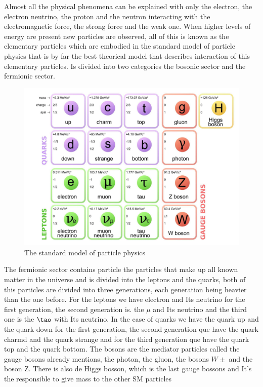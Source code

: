 Almost all the physical phenomena can be explained with only the electron, the electron neutrino, the proton and the neutron interacting with the electromagnetic force, the strong force and the weak one. When higher levels of energy are present new particles are observed, all of this is known as the elementary particles which are embodied in the standard model of particle physics that is by far the best theorical model that describes interaction of this elementary particles. Is divided into two categories the bosonic sector and the fermionic sector.  \cite{mppthomson}   


\begin{figure}[h]
    \centering
   \includegraphics[width=1\textwidth]{sm.png}
    \caption{The standard model of particle physics}
    \label{fig:four-forces}
\end{figure}


The fermionic sector contains particle the particles that make up all known matter in the universe and is divided into the leptons and the quarks, both of this particles are divided into three generations, each generation being heavier than the one before. For the leptons we have electron and Its neutrino for the first generation, the second generation is. the $\mu$ and Its neutrino and the third one is the $\tao$ with Its neutrino. In the case of quarks we have the quark up and the quark down for the first generation, the second generation que have the quark charmd and the quark strange and for the third generation que have the quark top and the quark bottom. The bosons are the mediator particles called the gauge bosons already mentions, the photon, the gluon, the bosons $W\pm$ and the boson Z. There is also de Higgs bosson, which is the last gauge bossons and It's the responsible to give mass to the other SM particles  


